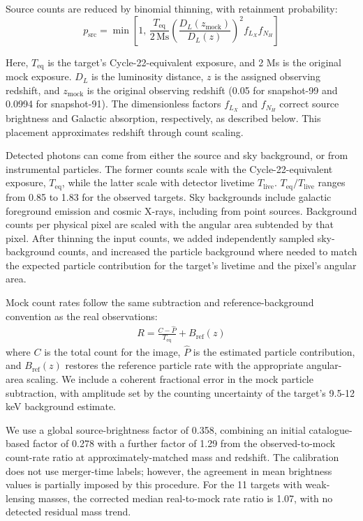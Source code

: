 Source counts are reduced by binomial thinning, with retainment probability:
\begin{equation}
    p_\text{src}
    = \min\! \left[1,\,
    \frac{T_\text{eq}}{2\,\text{Ms}}
    \left( \frac{D_L(z_\text{mock})}{D_L(z)} \right)^2
    f_{L_X} f_{N_H}
    \right]
\end{equation}

Here, $T_\text{eq}$ is the target's Cycle-22-equivalent exposure, and 2 Ms is the original mock exposure.
$D_L$ is the luminosity distance, $z$ is the assigned observing redshift, and $z_\text{mock}$ is the original observing redshift (0.05 for snapshot-99 and 0.0994 for snapshot-91).
The dimensionless factors $f_{L_X}$ and $f_{N_H}$ correct source brightness and Galactic absorption, respectively, as described below.
This placement approximates redshift through count scaling.

Detected photons can come from either the source and sky background, or from instrumental particles.
The former counts scale with the Cycle-22-equivalent exposure, $T_\text{eq}$, while the latter scale with detector livetime $T_\text{live}$.
$T_\text{eq} / T_\text{live}$ ranges from 0.85 to 1.83 for the observed targets.
Sky backgrounds include galactic foreground emission and cosmic X-rays, including from point sources.
Background counts per physical pixel are scaled with the angular area subtended by that pixel.
After thinning the input counts, we added independently sampled sky-background counts, and increased the particle background where needed to match the expected particle contribution for the target's livetime and the pixel's angular area.

Mock count rates follow the same subtraction and reference-background convention as the real observations:
\begin{align*}
    R
    = \frac{C-\hat P}{T_\text{eq}} + B_\text{ref}(z)
\end{align*}
where $C$ is the total count for the image, $\hat P$ is the estimated particle contribution, and $B_\text{ref}(z)$ restores the reference particle rate with the appropriate angular-area scaling.
We include a coherent fractional error in the mock particle subtraction, with amplitude set by the counting uncertainty of the target's 9.5-12 keV background estimate.

We use a global source-brightness factor of 0.358, combining an initial catalogue-based factor of 0.278 with a further factor of 1.29 from the observed-to-mock count-rate ratio at approximately-matched mass and redshift.
The calibration does not use merger-time labels; however, the agreement in mean brightness values is partially imposed by this procedure.
For the 11 targets with weak-lensing masses, the corrected median real-to-mock rate ratio is 1.07, with no detected residual mass trend.

